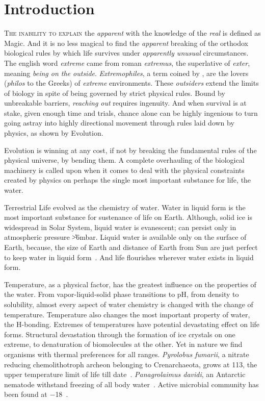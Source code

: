 \chapter{Introduction}
{\scshape The inability to explain} the \emph{apparent} with the
knowledge of the \emph{real} is defined as Magic. And it is no
less magical to find the \emph{apparent} breaking of the orthodox
biological rules by which life survives under \emph{apparently
unusual} circumstances. The english word \emph{extreme} came from
roman \emph{extremus}, the superlative of \emph{exter}, meaning
\emph{being on the outside}. \emph{Extremophiles}, a term coined
by \citet{MacElroy1974}, are the lovers (\emph{philos} to the
Greeks) of \emph{extreme} environments. These \emph{outsiders}
extend the limits of biology in spite of being governed by strict
physical rules. Bound by unbreakable barriers, \emph{reaching out}
requires ingenuity. And when survival is at stake, given enough
time and trials, chance alone can be highly ingenious to turn
going astray into highly directional movement through rules laid
down by physics, as shown by Evolution.

Evolution is winning at any cost, if not by breaking the
fundamental rules of the physical universe, by bending them. A
complete overhauling of the biological machinery is called upon
when it comes to deal with the physical constraints created by
physics on perhaps the single most important substance for life,
the water.

Terrestrial Life evolved as the chemistry of water. Water in
liquid form is the most important substance for sustenance of life
on Earth. Although, solid ice is widespread in Solar System,
liquid water is evanescent; can persist only in atmospheric
pressure \U{>6}{mbar}. Liquid water is available only on the
surface of Earth, because, the size of Earth and distance of Earth
from Sun are just perfect to keep water in liquid
form~\citep{Brack1998}. And life flourishes wherever water exists
in liquid form.

Temperature, as a physical factor, has the greatest influence on
the properties of the water. From vapor-liquid-solid phase
transitions to pH, from density to solubility, almost every aspect
of water chemistry is changed with the change of temperature.
Temperature also changes the most important property of water, the
H-bonding. Extremes of temperatures have potential devastating
effect on life forms. Structural devastation through the formation
of ice crystals on one extreme, to denaturation of biomolecules at
the other. Yet in nature we find organisms with thermal
preferences for all ranges. \emph{Pyrolobus fumarii}, a nitrate
reducing chemolithotroph archeon belonging to Crenarchaeota, grows
at 113\dg{}, the upper temperature limit of life till
date~\citep{Blochl1997}. \emph{Panagrolaimus davidi}, an Antarctic
nematode withstand freezing of all body water~\citep{Wharton1995}.
Active microbial community has been found at
$-$18\dg{}~\citep{Rothschild2001}.

